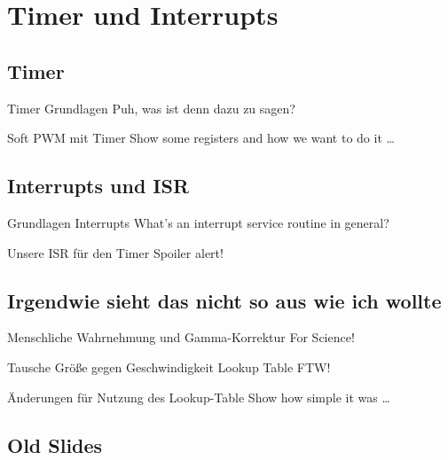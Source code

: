 \documentclass{beamer}
\begin{document}
\section{Timer und Interrupts}

\subsection{Timer}

\begin{frame}{Timer Grundlagen}
    Puh, was ist denn dazu zu sagen?
\end{frame}

\begin{frame}{Soft PWM mit Timer}
    Show some registers and how we want to do it …
\end{frame}

\subsection{Interrupts und ISR}

\begin{frame}{Grundlagen Interrupts}
    What's an interrupt service routine in general?
\end{frame}

\begin{frame}{Unsere ISR für den Timer}
    Spoiler alert!
\end{frame}

\subsection{Irgendwie sieht das nicht so aus wie ich wollte}

\begin{frame}{Menschliche Wahrnehmung und Gamma-Korrektur}
    For Science!
\end{frame}

\begin{frame}{Tausche Größe gegen Geschwindigkeit}
    Lookup Table FTW!
\end{frame}

\begin{frame}{Änderungen für Nutzung des Lookup-Table}
    Show how simple it was …
\end{frame}

\subsection{Old Slides}
\end{document}
